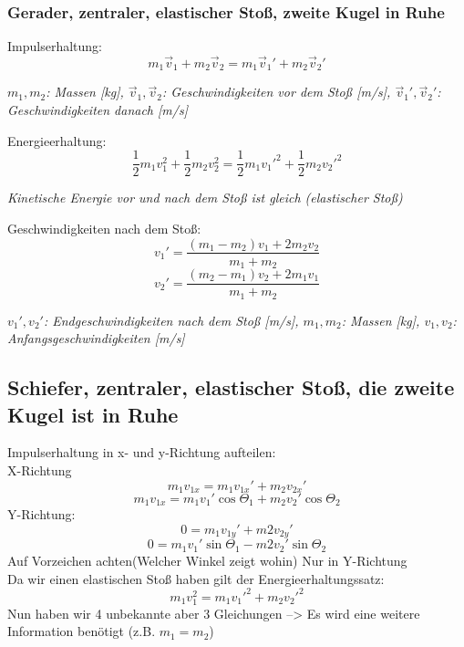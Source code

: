 \documentclass[a4paper,10pt]{article}
\newenvironment{displayformula}
{
	\begin{framed}
		\color{formulaColor}
	}
	{\end{framed}}
\newcommand{\formulalegend}[1]{%
	\par\vspace{0.5ex}%
	{{\color{legendColor}\RaggedRight\small\textit{#1}}}%
	\par\vspace{1.5ex}%
}
\begin{document}
\subsubsection{Gerader, zentraler, elastischer Stoß, zweite Kugel in Ruhe}

\begin{displayformula}
	Impulserhaltung:
	\[
	m_1 \vec{v}_1 + m_2 \vec{v}_2 = m_1 \vec{v}_1' + m_2 \vec{v}_2'
	\]
\end{displayformula}
\formulalegend{
	\( m_1, m_2 \): Massen [kg], \( \vec{v}_1, \vec{v}_2 \): Geschwindigkeiten vor dem Stoß [m/s], \( \vec{v}_1', \vec{v}_2' \): Geschwindigkeiten danach [m/s]
}

\begin{displayformula}
	Energieerhaltung:
	\[
	\frac{1}{2} m_1 v_1^2 + \frac{1}{2} m_2 v_2^2 = \frac{1}{2} m_1 {v_1'}^2 + \frac{1}{2} m_2 {v_2'}^2
	\]
\end{displayformula}
\formulalegend{
	Kinetische Energie vor und nach dem Stoß ist gleich (elastischer Stoß)
}

\begin{displayformula}
	Geschwindigkeiten nach dem Stoß:
	\[
	v_1' = \frac{(m_1 - m_2) v_1 + 2 m_2 v_2}{m_1 + m_2}
	\]
	\[
	v_2' = \frac{(m_2 - m_1) v_2 + 2 m_1 v_1}{m_1 + m_2}
	\]
\end{displayformula}
\formulalegend{
	\( v_1', v_2' \): Endgeschwindigkeiten nach dem Stoß [m/s], \( m_1, m_2 \): Massen [kg], \( v_1, v_2 \): Anfangsgeschwindigkeiten [m/s]
}

\subsection{Schiefer, zentraler, elastischer Stoß, die zweite Kugel ist in Ruhe}

\begin{displayformula}
	Impulserhaltung in x- und y-Richtung aufteilen: \\
	X-Richtung
	\[
	m_1v_{1x} = m_1v_{1x}' + m_2v_{2x}'
	\]
	\[
	m_1v_{1x} = m_1v_1' \cos \Theta_1 + m_2v_2' \cos \Theta_2
	\]
	Y-Richtung:
	\[
	0 = m_1v_{1y}' + m2v_{2y}'
	\]
	\[
	0 = m_1v_1' \sin \Theta_1  - m2v_2' \sin \Theta_2
	\]
	Auf Vorzeichen achten(Welcher Winkel zeigt wohin) Nur in Y-Richtung \\
	Da wir einen elastischen Stoß haben gilt der Energieerhaltungssatz:
	\[
		m_1 v_1^2 = m_1 v_1'^2 +  m_2 v_2'^2
	\]
	Nun haben wir 4 unbekannte aber 3 Gleichungen --> Es wird eine weitere Information benötigt (z.B. $m_1 = m_2$)
\end{displayformula}
\end{document}
